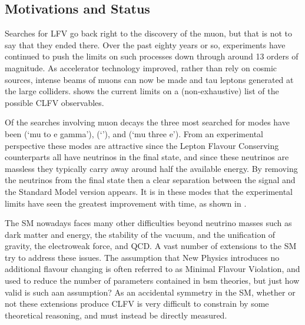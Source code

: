 \subsection{Motivations and Status}
Searches for \ac{LFV} go back right to the discovery of the muon, but that is not to say that they ended there.
Over the past eighty years or so, experiments have continued to push the limits on such processes down through around 13 orders of magnitude.
As accelerator technology improved, rather than rely on cosmic sources, intense beams of muons can now be made and tau leptons generated at the large colliders.
 shows the current limits on a (non-exhaustive) list of the possible \ac{CLFV} observables.

Of the searches involving muon decays the three most searched for modes have been \mueg (`mu to e gamma'), \muec (`\mueconv'), and \muThreeE (`mu three e').
From an experimental perspective these modes are attractive since the Lepton Flavour Conserving counterparts all have neutrinos in the final state, and since these neutrinos are massless they typically carry away around half the available energy.
By removing the neutrinos from the final state then a clear separation between the signal and the Standard Model version appears.
It is in these modes that the experimental limits have seen the greatest improvement with time, as shown in .

The \ac{SM} nowadays faces many other difficulties beyond neutrino masses such as dark matter and energy, the stability of the vacuum, and the unification of gravity, the electroweak force, and \ac{QCD}.
A vast number of extensions to the \ac{SM} try to address these issues.
The assumption that New Physics introduces no additional flavour changing is often referred to as Minimal Flavour Violation, and used to reduce the number of parameters contained in \ac{bsm} theories, but just how valid is such aan assumption?
As an accidental symmetry in the \ac{SM}, whether or not these extensions produce \ac{CLFV} is very difficult to constrain by some theoretical reasoning, and must instead be directly measured.

